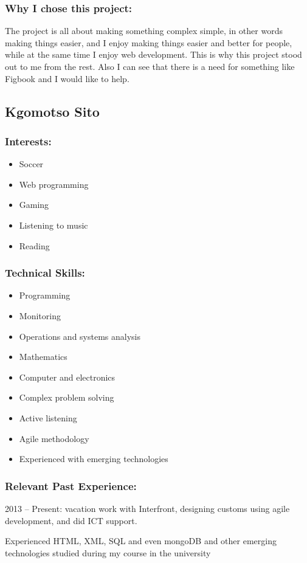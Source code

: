 \subsubsection{Why I chose this project:}
	\par{The project is all about making something complex simple, in other words making things easier, and I enjoy making things easier and better for people, while at the same time I enjoy web development. This is why this project stood out to me from the rest. Also I can see that there is a need for something like Figbook and I would like to help.}

\newpage
\subsection{Kgomotso Sito}
\subsubsection{Interests:}
	\begin{itemize}
		\item Soccer
		\item Web programming
		\item Gaming
		\item Listening to music 
		\item Reading 
	\end{itemize}
\subsubsection{Technical Skills:}
	\begin{itemize}
		\item Programming
		\item Monitoring
		\item Operations and systems analysis
		\item Mathematics
		\item Computer and electronics 
		\item Complex problem solving
		\item Active listening
		\item Agile methodology
		\item Experienced with emerging technologies
	\end{itemize}
	
\subsubsection{Relevant Past Experience:}
\par{2013 – Present: vacation work with Interfront, designing customs using agile development, and did ICT support.
}
\par{Experienced HTML, XML, SQL and even mongoDB and other emerging technologies studied during my course in the university
}
